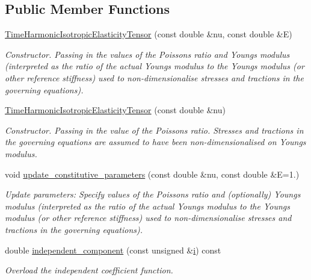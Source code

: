 \subsection*{Public Member Functions}
\begin{DoxyCompactItemize}
\item 
\hyperlink{classoomph_1_1TimeHarmonicIsotropicElasticityTensor_a877c58bd18dbe1485fbb07ce0e3e2b38}{Time\+Harmonic\+Isotropic\+Elasticity\+Tensor} (const double \&nu, const double \&E)
\begin{DoxyCompactList}\small\item\em Constructor. Passing in the values of the Poisson\textquotesingle{}s ratio and Young\textquotesingle{}s modulus (interpreted as the ratio of the actual Young\textquotesingle{}s modulus to the Young\textquotesingle{}s modulus (or other reference stiffness) used to non-\/dimensionalise stresses and tractions in the governing equations). \end{DoxyCompactList}\item 
\hyperlink{classoomph_1_1TimeHarmonicIsotropicElasticityTensor_a3d3e2187be7b2934ff064b3fbf040f6f}{Time\+Harmonic\+Isotropic\+Elasticity\+Tensor} (const double \&nu)
\begin{DoxyCompactList}\small\item\em Constructor. Passing in the value of the Poisson\textquotesingle{}s ratio. Stresses and tractions in the governing equations are assumed to have been non-\/dimensionalised on Young\textquotesingle{}s modulus. \end{DoxyCompactList}\item 
void \hyperlink{classoomph_1_1TimeHarmonicIsotropicElasticityTensor_a607f47914b93b3dba5d3696862e0ba20}{update\+\_\+constitutive\+\_\+parameters} (const double \&nu, const double \&E=1.)
\begin{DoxyCompactList}\small\item\em Update parameters\+: Specify values of the Poisson\textquotesingle{}s ratio and (optionally) Young\textquotesingle{}s modulus (interpreted as the ratio of the actual Young\textquotesingle{}s modulus to the Young\textquotesingle{}s modulus (or other reference stiffness) used to non-\/dimensionalise stresses and tractions in the governing equations). \end{DoxyCompactList}\item 
double \hyperlink{classoomph_1_1TimeHarmonicIsotropicElasticityTensor_a23e7e1a4c9ad0563378e613adce3c635}{independent\+\_\+component} (const unsigned \&\hyperlink{cfortran_8h_adb50e893b86b3e55e751a42eab3cba82}{i}) const
\begin{DoxyCompactList}\small\item\em Overload the independent coefficient function. \end{DoxyCompactList}\end{DoxyCompactItemize}
